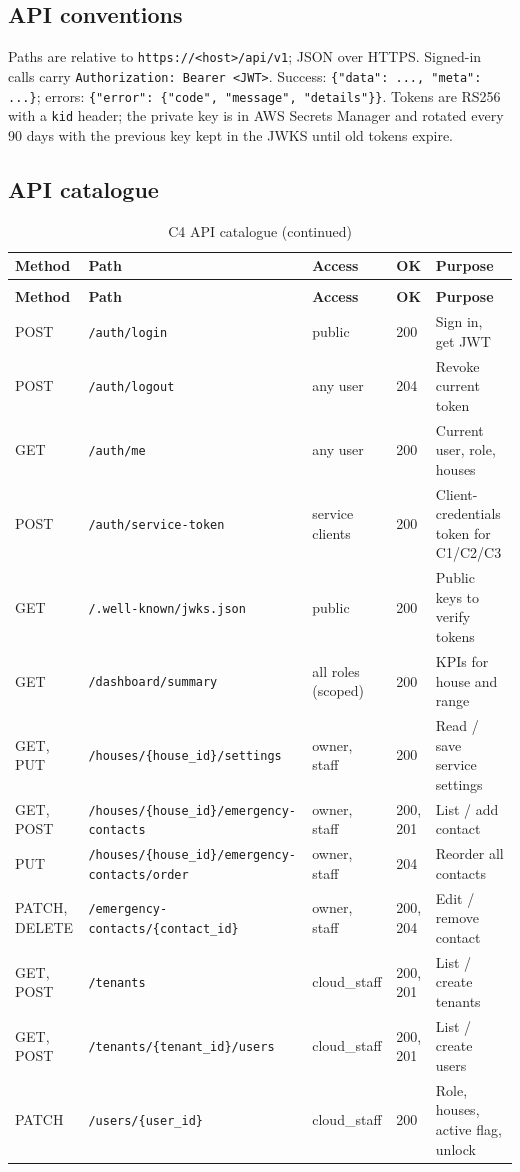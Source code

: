 \subsection{API conventions}
Paths are relative to \texttt{https://<host>/\allowbreak api/v1}; JSON over HTTPS. Signed-in calls carry
\texttt{Authorization: Bearer <JWT>}. Success: \texttt{\{"data": ..., "meta": ...\}}; errors:
\texttt{\{"error": \{"code", "message", "details"\}\}}. Tokens are RS256 with a \texttt{kid} header; the private key is in AWS
Secrets Manager and rotated every 90 days with the previous key kept in the JWKS until old tokens expire.

\subsection{API catalogue}
\begin{longtable}{L{1.3cm}L{5.0cm}L{2.8cm}L{1.1cm}L{4.4cm}}
\caption{C4 API catalogue}\label{tab:c4-catalogue}\\
\toprule
\textbf{Method} & \textbf{Path} & \textbf{Access} & \textbf{OK} & \textbf{Purpose} \\
\midrule
\endfirsthead
\caption[]{C4 API catalogue (continued)}\\
\toprule
\textbf{Method} & \textbf{Path} & \textbf{Access} & \textbf{OK} & \textbf{Purpose} \\
\midrule
\endhead
POST & \texttt{/auth/login} & public & 200 & Sign in, get JWT \\
POST & \texttt{/auth/logout} & any user & 204 & Revoke current token \\
GET & \texttt{/auth/me} & any user & 200 & Current user, role, houses \\
POST & \texttt{/auth/service-token} & service clients & 200 & Client-credentials token for C1/C2/C3 \\
GET & \texttt{/.well-known/jwks.json} & public & 200 & Public keys to verify tokens \\
GET & \texttt{/dashboard/summary} & all roles (scoped) & 200 & KPIs for house and range \\
GET, PUT & \texttt{/houses/\{house\_id\}/settings} & owner, staff & 200 & Read / save service settings \\
GET, POST & \texttt{/houses/\{house\_id\}/\allowbreak emergency-contacts} & owner, staff & 200, 201 & List / add contact \\
PUT & \texttt{/houses/\{house\_id\}/\allowbreak emergency-contacts/\allowbreak order} & owner, staff & 204 & Reorder all contacts \\
PATCH, DELETE & \texttt{/emergency-contacts/\{contact\_id\}} & owner, staff & 200, 204 & Edit / remove contact \\
GET, POST & \texttt{/tenants} & cloud\_staff & 200, 201 & List / create tenants \\
GET, POST & \texttt{/tenants/\{tenant\_id\}/users} & cloud\_staff & 200, 201 & List / create users \\
PATCH & \texttt{/users/\{user\_id\}} & cloud\_staff & 200 & Role, houses, active flag, unlock \\
\bottomrule
\end{longtable}

